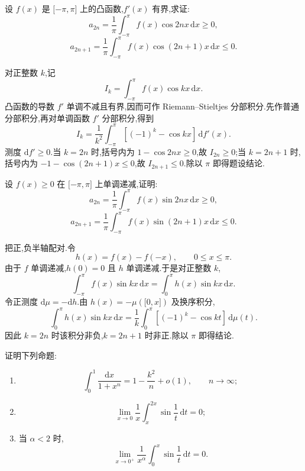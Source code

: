 \begin{example}
    设 $f(x)$ 是 $\lbrack -\pi,\pi\rbrack$ 上的凸函数,$f'(x)$ 有界,求证:
    \[
        a_{2n}=\dfrac{1}{\pi}\int_{-\pi}^\pi f(x)\cos2nx\,\mathrm{d}x\geq0,
    \]
    \[
        a_{2n+1}=\dfrac{1}{\pi}\int_{-\pi}^\pi f(x)\cos(2n+1)x\,\mathrm{d}x\leq0.
    \]
\end{example}
\exampleblank

\begin{solution}
    对正整数 $k$,记
    \[
        I_k=\int_{-\pi}^{\pi}f(x)\cos kx\,\mathrm{d}x.
    \]
    凸函数的导数 $f'$ 单调不减且有界,因而可作 Riemann--Stieltjes 分部积分.先作普通分部积分,再对单调函数 $f'$ 分部积分,得到
    \[
        I_k=\dfrac{1}{k^2}
        \int_{-\pi}^{\pi}[(-1)^k-\cos kx]\,\mathrm{d}f'(x).
    \]
    测度 $\mathrm{d}f'\geq0$.当 $k=2n$ 时,括号内为 $1-\cos2nx\geq0$,故 $I_{2n}\geq0$;当 $k=2n+1$ 时,括号内为 $-1-\cos(2n+1)x\leq0$,故 $I_{2n+1}\leq0$.除以 $\pi$ 即得题设结论.
\end{solution}

\begin{example}
    设 $f(x)\geq0$ 在 $\lbrack -\pi,\pi\rbrack$ 上单调递减,证明:
    \[
        a_{2n}=\dfrac{1}{\pi}\int_{-\pi}^\pi f(x)\sin2nx\,\mathrm{d}x\geq0,
    \]
    \[
        a_{2n+1}=\dfrac{1}{\pi}\int_{-\pi}^\pi f(x)\sin(2n+1)x\,\mathrm{d}x\leq0.
    \]
\end{example}
\exampleblank

\begin{solution}
    把正,负半轴配对.令
    \[
        h(x)=f(x)-f(-x),
        \qquad 0\leq x\leq\pi.
    \]
    由于 $f$ 单调递减,$h(0)=0$ 且 $h$ 单调递减.于是对正整数 $k$,
    \[
        \displaystyle\int_{-\pi}^{\pi}f(x)\sin kx\,\mathrm{d}x
        =\int_0^\pi h(x)\sin kx\,\mathrm{d}x.
    \]
    令正测度 $\mathrm{d}\mu=-\mathrm{d}h$.由 $h(x)=-\mu(\lbrack0,x\rbrack)$ 及换序积分,
    \[
        \displaystyle\int_0^\pi h(x)\sin kx\,\mathrm{d}x
        =\dfrac{1}{k}\int_0^\pi[(-1)^k-\cos kt]\,\mathrm{d}\mu(t).
    \]
    因此 $k=2n$ 时该积分非负,$k=2n+1$ 时非正.除以 $\pi$ 即得结论.
\end{solution}

\begin{example}
    证明下列命题:
    \begin{enumerate}
        \item
              \[
                  \displaystyle\int_0^1\dfrac{\mathrm{d}x}{1+x^n}
                  =1-\dfrac{k^2}{n}+o(1),
                  \qquad n\to\infty;
              \]
        \item
              \[
                  \displaystyle\lim\limits_{x\to0}\dfrac{1}{x}\int_x^{2x}\sin\dfrac{1}{t}\,\mathrm{d}t=0;
              \]
        \item 当 $\alpha<2$ 时,
              \[
                  \displaystyle\lim\limits_{x\to0^+}\dfrac{1}{x^\alpha}\int_0^x\sin\dfrac{1}{t}\,\mathrm{d}t=0.
              \]
    \end{enumerate}
\end{example}
\exampleblank

